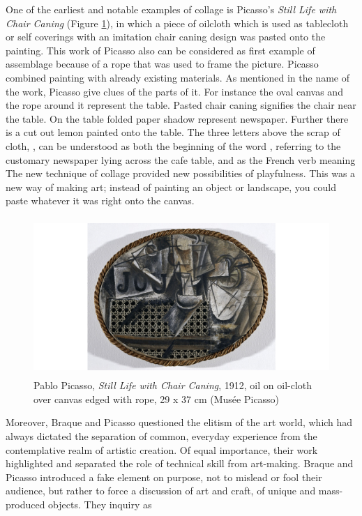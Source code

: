 One of the earliest and notable examples of collage is Picasso’s \textit{Still Life with Chair Caning} (Figure \ref{fig:Picasso_Chair}), in which a piece of oilcloth which is used as tablecloth or self coverings with an imitation chair caning design was pasted onto the painting. This work of Picasso also can be considered as first example of assemblage because of a rope that was used to frame the picture. Picasso combined painting with already existing materials. As mentioned in the name of the work, Picasso give clues of the parts of it. For instance the oval canvas and the rope around it represent the table. Pasted chair caning signifies the chair near the table. On the table folded paper shadow represent newspaper. Further there is a cut out lemon painted onto the table. The three letters above the scrap of cloth, , can be understood as both the beginning of the word , referring to the customary newspaper lying across the cafe table, and as the French verb meaning  The new technique of collage provided new possibilities of playfulness. This was a new way of making art; instead of painting an object or landscape, you could paste whatever it was right onto the canvas.

\begin{figure}[h!]
  \centering
  \includegraphics[height=6cm]{graphics/picasso_chair.png}
  \caption{Pablo Picasso, \textit{Still Life with Chair Caning}, 1912, oil on oil-cloth over canvas edged with rope, 29 x 37 cm (Musée Picasso)}
  \label{fig:Picasso_Chair}
\end{figure}

Moreover, Braque and Picasso questioned the elitism of the art world, which had always dictated the separation of common, everyday experience from the contemplative realm of artistic creation. Of equal importance, their work highlighted and separated the role of technical skill from art-making. Braque and Picasso introduced a fake element on purpose, not to mislead or fool their audience, but rather to force a discussion of art and craft, of unique and mass-produced objects. They inquiry as 

